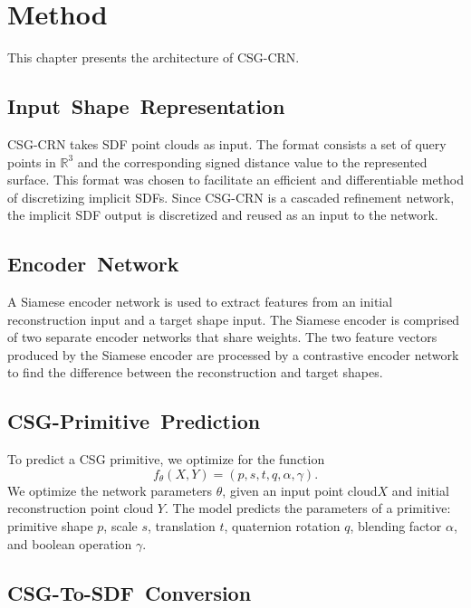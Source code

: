
\chapter{Method}
\label{chap:method}

This chapter presents the architecture of CSG-CRN.


\section{Input~Shape~Representation}
\label{sec:input_shape_representation}

CSG-CRN takes SDF point clouds as input. The format consists a set of query points in $\mathbb{R}^3$ and the corresponding signed distance value to the represented surface. This format was chosen to facilitate an efficient and differentiable method of discretizing implicit SDFs. Since CSG-CRN is a cascaded refinement network, the implicit SDF output is discretized and reused as an input to the network.


\section{Encoder~Network}
\label{sec:encoder_network}

A Siamese encoder network is used to extract features from an initial reconstruction input and a target shape input. The Siamese encoder is comprised of two separate encoder networks that share weights. The two feature vectors produced by the Siamese encoder are processed by a contrastive encoder network to find the difference between the reconstruction and target shapes.

\section{CSG-Primitive~Prediction}
\label{sec:csg_primitive_prediction}

To predict a CSG primitive, we optimize for the function
\[f_\theta (X, Y) = (p, s, t, q, \alpha, \gamma).\]
We optimize the network parameters $\theta$, given an input point cloud$X$ and initial reconstruction point cloud $Y$. The model predicts the parameters of a primitive: primitive shape $p$, scale $s$, translation $t$, quaternion rotation $q$, blending factor $\alpha$, and boolean operation $\gamma$.


\section{CSG-To-SDF~Conversion}
\label{sec:csg_to_sdf_conversion}

